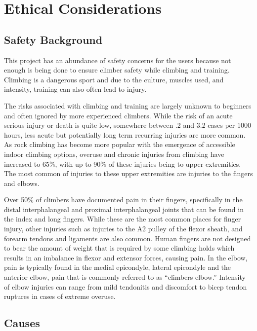 \documentclass[10pt,twocolumn]{article}
\begin{document}
\section{Ethical Considerations}

\subsection{Safety Background}
    This project has an abundance of safety concerns for the users because not enough is being done to ensure climber safety while climbing and training. Climbing is a dangerous sport and due to the culture, muscles used, and intensity, training can also often lead to injury.  
	
	The risks associated with climbing and training are largely unknown to beginners and often ignored by more experienced climbers. While the risk of an acute serious injury or death is quite low, somewhere between .2 and 3.2 cases per 1000 hours, less acute but potentially long term recurring injuries are more common. As rock climbing has become more popular with the emergence of accessible indoor climbing options, overuse and chronic injuries from climbing have increased to 65\%, with up to 90\% of these injuries being to upper extremities. The most common of injuries to these upper extremities are injuries to the fingers and elbows. \cite{meyers_rock_nodate}

    Over 50\% of climbers have documented pain in their fingers, specifically in the distal interphalangeal and proximal interphalangeal joints that can be found in the index and long fingers. \cite{meyers_rock_nodate} While these are the most common places for finger injury, other injuries such as injuries to the A2 pulley of the flexor sheath, and forearm tendons and ligaments are also common. Human fingers are not designed to bear the amount of weight that is required by some climbing holds which results in an imbalance in flexor and extensor forces, causing pain. In the elbow, pain is typically found in the medial epicondyle, lateral epicondyle and the anterior elbow, pain that is commonly referred to as “climbers elbow.” Intensity of elbow injuries can range from mild tendonitis and discomfort to bicep tendon ruptures in cases of extreme overuse. \cite{meyers_rock_nodate}

\subsection{Causes}
\end{document}
